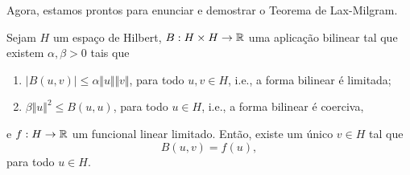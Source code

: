Agora, estamos prontos para enunciar e demostrar o Teorema de Lax-Milgram.

\begin{tbox} \label{thm:lax-milgram}
    Sejam $H$ um espaço de Hilbert, $B : H \times H \to \mathbb{R}$ uma aplicação bilinear tal que existem $\alpha, \beta > 0$ tais que
    \begin{enumerate}
        \item $| B(u,v)| \leqslant \alpha \Vert u \Vert \Vert v \Vert$, para todo $u,v \in H$, i.e., a forma bilinear é limitada;
        \item $\beta \Vert u \Vert^2 \leqslant B(u,u)$, para todo $u \in H$, i.e., a forma bilinear é coerciva,
    \end{enumerate}
    e $f : H \to \mathbb{R}$ um funcional linear limitado. Então, existe um único $v \in H$ tal que
    \[
        B(u,v) = f(u),
    \]
    para todo $u \in H$.
\end{tbox}
